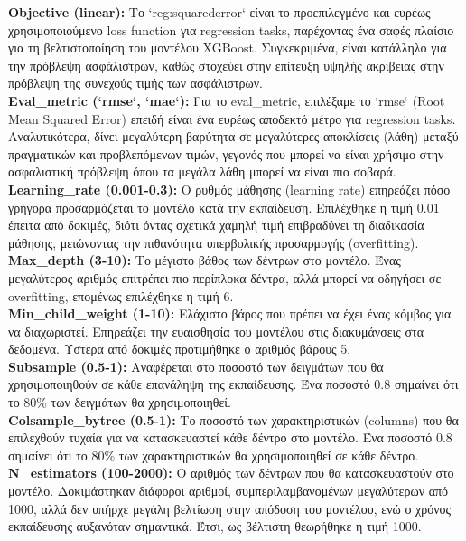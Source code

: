 \documentclass{llncs}
\begin{document}
\noindent \textbf{Objective (linear):}
Το `reg:squarederror` είναι το προεπιλεγμένο και ευρέως χρησιμοποιούμενο loss function για regression tasks, παρέχοντας ένα σαφές πλαίσιο για τη βελτιστοποίηση του μοντέλου XGBoost. Συγκεκριμένα, είναι κατάλληλο για την πρόβλεψη ασφάλιστρων, καθώς στοχεύει στην επίτευξη υψηλής ακρίβειας στην πρόβλεψη της συνεχούς τιμής των ασφάλιστρων. \\

\noindent \textbf{Eval\_metric (`rmse`, `mae`):}
Για το eval\_metric, επιλέξαμε το `rmse` (Root Mean Squared Error) επειδή είναι ένα ευρέως αποδεκτό μέτρο για regression tasks. Αναλυτικότερα, δίνει μεγαλύτερη βαρύτητα σε μεγαλύτερες αποκλίσεις (λάθη) μεταξύ πραγματικών και προβλεπόμενων τιμών, γεγονός που μπορεί να είναι χρήσιμο στην ασφαλιστική πρόβλεψη όπου τα μεγάλα λάθη μπορεί να είναι πιο σοβαρά.\\

\noindent \textbf{Learning\_rate (0.001-0.3):}
Ο ρυθμός μάθησης (learning rate) επηρεάζει πόσο γρήγορα προσαρμόζεται το μοντέλο κατά την εκπαίδευση. Επιλέχθηκε η τιμή 0.01 έπειτα από δοκιμές, διότι όντας σχετικά χαμηλή τιμή επιβραδύνει τη διαδικασία μάθησης, μειώνοντας την πιθανότητα υπερβολικής προσαρμογής (overfitting).\\

\noindent \textbf{Max\_depth (3-10):}
Το μέγιστο βάθος των δέντρων στο μοντέλο. Ένας μεγαλύτερος αριθμός επιτρέπει πιο περίπλοκα δέντρα, αλλά μπορεί να οδηγήσει σε overfitting, επομένως επιλέχθηκε η τιμή 6. \\

\noindent \textbf{Min\_child\_weight (1-10):}
Ελάχιστο βάρος που πρέπει να έχει ένας κόμβος για να διαχωριστεί. Επηρεάζει την ευαισθησία του μοντέλου στις διακυμάνσεις στα δεδομένα. Ύστερα από δοκιμές προτιμήθηκε ο αριθμός βάρους 5.\\

\noindent \textbf{Subsample (0.5-1):}
Αναφέρεται στο ποσοστό των δειγμάτων που θα χρησιμοποιηθούν σε κάθε επανάληψη της εκπαίδευσης. Ένα ποσοστό 0.8 σημαίνει ότι το 80\% των δειγμάτων θα χρησιμοποιηθεί.\\

\noindent \textbf{Colsample\_bytree (0.5-1):}
Το ποσοστό των χαρακτηριστικών (columns) που θα επιλεχθούν τυχαία για να κατασκευαστεί κάθε δέντρο στο μοντέλο. Ένα ποσοστό 0.8 σημαίνει ότι το 80\% των χαρακτηριστικών θα χρησιμοποιηθεί σε κάθε δέντρο.\\

\noindent \textbf{N\_estimators (100-2000):}
Ο αριθμός των δέντρων που θα κατασκευαστούν στο μοντέλο. Δοκιμάστηκαν διάφοροι αριθμοί, συμπεριλαμβανομένων μεγαλύτερων από 1000, αλλά δεν υπήρχε μεγάλη βελτίωση στην απόδοση του μοντέλου, ενώ ο χρόνος εκπαίδευσης αυξανόταν σημαντικά. Έτσι, ως βέλτιστη θεωρήθηκε η τιμή 1000.\\
\end{document}

